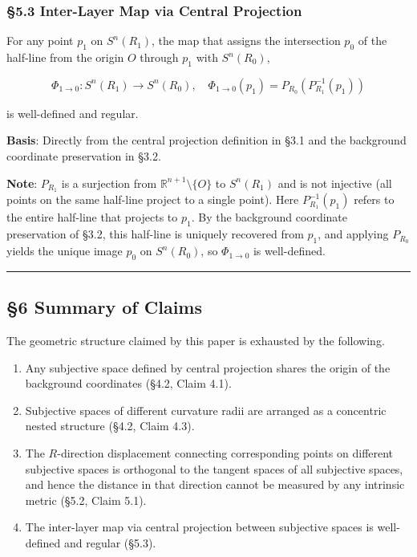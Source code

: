 \documentclass[
  a4paper,11pt]{article}
\providecommand{\tightlist}{%
  \setlength{\itemsep}{0pt}\setlength{\parskip}{0pt}}
\begin{document}
\subsubsection{§5.3 Inter-Layer Map via Central
Projection}\label{inter-layer-map-via-central-projection}

For any point \(p_1\) on \(S^n(R_1)\), the map that assigns the
intersection \(p_0\) of the half-line from the origin \(O\) through
\(p_1\) with \(S^n(R_0)\),

\[
\Phi_{1 \to 0} : S^n(R_1) \to S^n(R_0), \quad \Phi_{1 \to 0}(p_1) = P_{R_0}(P_{R_1}^{-1}(p_1))
\]

is well-defined and regular.

\textbf{Basis}: Directly from the central projection definition in §3.1
and the background coordinate preservation in §3.2.

\textbf{Note}: \(P_{R_1}\) is a surjection from
\(\mathbb{R}^{n+1} \setminus \{O\}\) to \(S^n(R_1)\) and is not
injective (all points on the same half-line project to a single point).
Here \(P_{R_1}^{-1}(p_1)\) refers to the entire half-line that projects
to \(p_1\). By the background coordinate preservation of §3.2, this
half-line is uniquely recovered from \(p_1\), and applying \(P_{R_0}\)
yields the unique image \(p_0\) on \(S^n(R_0)\), so \(\Phi_{1 \to 0}\)
is well-defined.

\begin{center}\rule{0.5\linewidth}{0.5pt}\end{center}

\subsection{§6 Summary of Claims}\label{summary-of-claims}

The geometric structure claimed by this paper is exhausted by the
following.

\begin{enumerate}
\def\labelenumi{\arabic{enumi}.}
\tightlist
\item
  Any subjective space defined by central projection shares the origin
  of the background coordinates (§4.2, Claim 4.1).
\item
  Subjective spaces of different curvature radii are arranged as a
  concentric nested structure (§4.2, Claim 4.3).
\item
  The \(R\)-direction displacement connecting corresponding points on
  different subjective spaces is orthogonal to the tangent spaces of all
  subjective spaces, and hence the distance in that direction cannot be
  measured by any intrinsic metric (§5.2, Claim 5.1).
\item
  The inter-layer map via central projection between subjective spaces
  is well-defined and regular (§5.3).
\end{enumerate}
\end{document}
